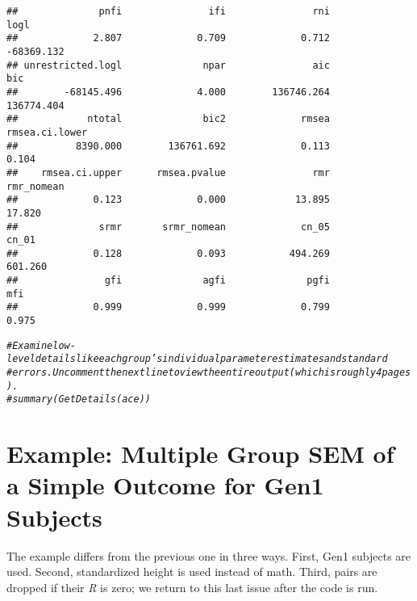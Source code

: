 \documentclass{article}\usepackage[]{graphicx}\usepackage[]{color}
\makeatletter
\newcommand{\hlcom}[1]{\textcolor[rgb]{0.678,0.584,0.686}{\textit{#1}}}%
\newenvironment{kframe}{%
 \def\at@end@of@kframe{}%
 \ifinner\ifhmode%
  \def\at@end@of@kframe{\end{minipage}}%
  \begin{minipage}{\columnwidth}%
 \fi\fi%
 \def\FrameCommand##1{\hskip\@totalleftmargin \hskip-\fboxsep
 \colorbox{shadecolor}{##1}\hskip-\fboxsep
     \hskip-\linewidth \hskip-\@totalleftmargin \hskip\columnwidth}%
 \MakeFramed {\advance\hsize-\width
   \@totalleftmargin\z@ \linewidth\hsize
   \@setminipage}}%
 {\par\unskip\endMakeFramed%
 \at@end@of@kframe}
\newenvironment{knitrout}{}{} %
\makeatother
\begin{document}
\begin{knitrout}
\begin{kframe}
\begin{verbatim}
##              pnfi               ifi               rni              logl 
##             2.807             0.709             0.712        -68369.132 
## unrestricted.logl              npar               aic               bic 
##        -68145.496             4.000        136746.264        136774.404 
##            ntotal              bic2             rmsea    rmsea.ci.lower 
##          8390.000        136761.692             0.113             0.104 
##    rmsea.ci.upper      rmsea.pvalue               rmr        rmr_nomean 
##             0.123             0.000            13.895            17.820 
##              srmr       srmr_nomean             cn_05             cn_01 
##             0.128             0.093           494.269           601.260 
##               gfi              agfi              pgfi               mfi 
##             0.999             0.999             0.799             0.975
\end{verbatim}
\begin{alltt}
\hlcom{#Examine low-level details like each group's individual parameter estimates and standard}
\hlcom{#  errors.  Uncomment the next line to view the entire output (which is roughly 4 pages).}
\hlcom{#summary(GetDetails(ace))}
\end{alltt}
\end{kframe}
\end{knitrout}


\section{Example: Multiple Group SEM of a Simple Outcome for Gen1 Subjects}
The example differs from the previous one in three ways.  First, Gen1 subjects are used.  Second, standardized height is used instead of math.  Third, pairs are dropped if their \emph{R} is zero; we return to this last issue after the code is run.
\end{document}
